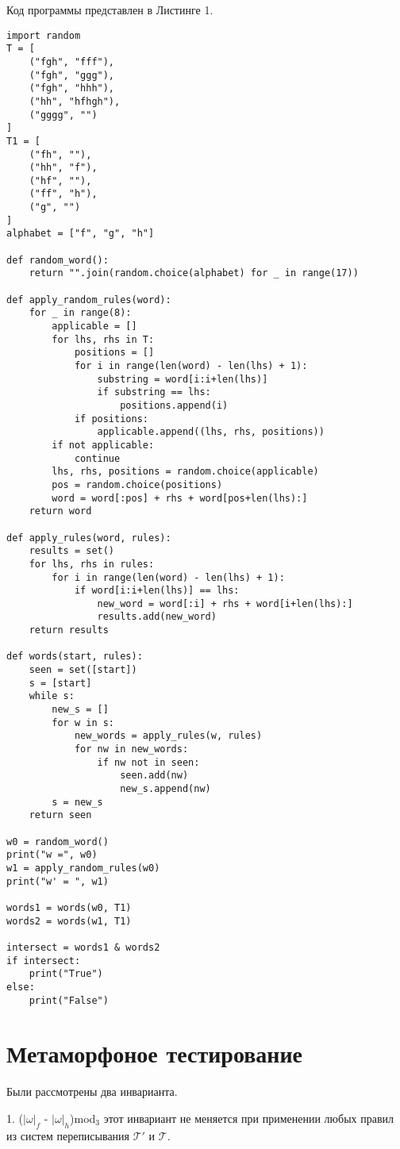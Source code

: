 \documentclass[a4paper, 14pt]{extarticle}
\begin{document}
Код программы представлен в Листинге 1.
\begin{lstlisting}
import random
T = [
    ("fgh", "fff"),
    ("fgh", "ggg"),
    ("fgh", "hhh"),
    ("hh", "hfhgh"),
    ("gggg", "")
]
T1 = [
    ("fh", ""),
    ("hh", "f"),
    ("hf", ""),
    ("ff", "h"),
    ("g", "")
]
alphabet = ["f", "g", "h"]

def random_word():
    return "".join(random.choice(alphabet) for _ in range(17))

def apply_random_rules(word):
    for _ in range(8):
        applicable = []
        for lhs, rhs in T:
            positions = []  
            for i in range(len(word) - len(lhs) + 1):  
                substring = word[i:i+len(lhs)] 
                if substring == lhs:  
                    positions.append(i) 
            if positions:
                applicable.append((lhs, rhs, positions))
        if not applicable:
            continue
        lhs, rhs, positions = random.choice(applicable)
        pos = random.choice(positions)
        word = word[:pos] + rhs + word[pos+len(lhs):]
    return word

def apply_rules(word, rules):
    results = set()
    for lhs, rhs in rules:
        for i in range(len(word) - len(lhs) + 1):
            if word[i:i+len(lhs)] == lhs:
                new_word = word[:i] + rhs + word[i+len(lhs):]
                results.add(new_word)
    return results

def words(start, rules):
    seen = set([start])
    s = [start]
    while s:
        new_s = []
        for w in s:
            new_words = apply_rules(w, rules)
            for nw in new_words:
                if nw not in seen:
                    seen.add(nw)
                    new_s.append(nw)
        s = new_s
    return seen
    
w0 = random_word()
print("w =", w0)
w1 = apply_random_rules(w0)
print("w' = ", w1)

words1 = words(w0, T1)
words2 = words(w1, T1)

intersect = words1 & words2
if intersect:
    print("True")
else:
    print("False")
\end{lstlisting}

\section{Метаморфоное тестирование}
Были рассмотрены два инварианта.

1. ($|\omega|_f$ - $|\omega|_h$)mod$_3$ этот инвариант не меняется при применении любых правил из систем переписывания $\mathcal{T}'$ и $\mathcal{T}$.
\end{document}
